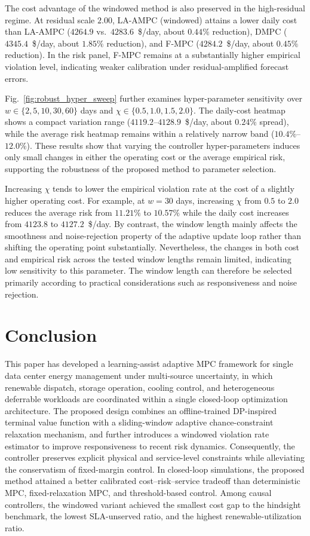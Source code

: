 \documentclass[a4paper,fleqn]{cas-dc}
\theoremstyle{plain}
\theoremstyle{remark}
\theoremstyle{plain}
\begin{document}
The cost advantage of the windowed method is also preserved in the high-residual regime. At residual scale $2.00$, LA-AMPC (windowed) attains a lower daily cost than LA-AMPC ($4264.9$ vs.\ $4283.6$~\$/day, about $0.44\%$ reduction), DMPC ($4345.4$~\$/day, about $1.85\%$ reduction), and F-MPC ($4284.2$~\$/day, about $0.45\%$ reduction). In the risk panel, F-MPC remains at a substantially higher empirical violation level, indicating weaker calibration under residual-amplified forecast errors.

Fig.~\ref{fig:robust_hyper_sweep} further examines hyper-parameter sensitivity over $w\in\{2,5,10,30,60\}$ days and $\chi\in\{0.5,1.0,1.5,2.0\}$. The daily-cost heatmap shows a compact variation range ($4119.2$--$4128.9$~\$/day, about $0.24\%$ spread), while the average risk heatmap remains within a relatively narrow band ($10.4\%$--$12.0\%$). These results show that varying the controller hyper-parameters induces only small changes in either the operating cost or the average empirical risk, supporting the robustness of the proposed method to parameter selection.

Increasing $\chi$ tends to lower the empirical violation rate at the cost of a slightly higher operating cost. For example, at $w=30$ days, increasing $\chi$ from $0.5$ to $2.0$ reduces the average risk from $11.21\%$ to $10.57\%$ while the daily cost increases from $4123.8$ to $4127.2$~\$/day. By contrast, the window length mainly affects the smoothness and noise-rejection property of the adaptive update loop rather than shifting the operating point substantially. Nevertheless, the changes in both cost and empirical risk across the tested window lengths remain limited, indicating low sensitivity to this parameter. The window length can therefore be selected primarily according to practical considerations such as responsiveness and noise rejection.

\section{Conclusion}\label{sec:conclusion}

This paper has developed a learning-assist adaptive MPC framework for single data center energy management under multi-source uncertainty, in which renewable dispatch, storage operation, cooling control, and heterogeneous deferrable workloads are coordinated within a single closed-loop optimization architecture. The proposed design combines an offline-trained DP-inspired terminal value function with a sliding-window adaptive chance-constraint relaxation mechanism, and further introduces a windowed violation rate estimator to improve responsiveness to recent risk dynamics. Consequently, the controller preserves explicit physical and service-level constraints while alleviating the conservatism of fixed-margin control. In closed-loop simulations, the proposed method attained a better calibrated cost--risk--service tradeoff than deterministic MPC, fixed-relaxation MPC, and threshold-based control. Among causal controllers, the windowed variant achieved the smallest cost gap to the hindsight benchmark, the lowest SLA-unserved ratio, and the highest renewable-utilization ratio.
\end{document}
